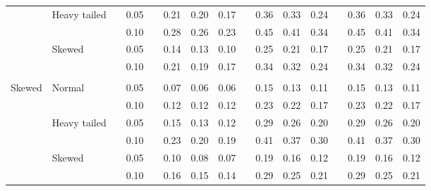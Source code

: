 \documentclass[12pt]{article} %
\begin{document}
\begin{table}[ht]
\begin{scriptsize}
\begin{center}
\begin{tabular}{ll p{.1cm} c p{.1cm} rrr p{.1cm} rrr p{.1cm} rrr}
             & Heavy tailed && 0.05 &&   0.21 & 0.20 & 0.17 && 0.36 & 0.33 & 0.24 && 0.36 & 0.33 & 0.24 \\ 
             &              && 0.10 &&   0.28 & 0.26 & 0.23 && 0.45 & 0.41 & 0.34 && 0.45 & 0.41 & 0.34 \\ 
             & Skewed       && 0.05 &&   0.14 & 0.13 & 0.10 && 0.25 & 0.21 & 0.17 && 0.25 & 0.21 & 0.17 \\ 
             &              && 0.10 &&   0.21 & 0.19 & 0.17 && 0.34 & 0.32 & 0.24 && 0.34 & 0.32 & 0.24 \\
             &&&&&&&&&&&&&&&\\ 
Skewed       & Normal       && 0.05 &&   0.07 & 0.06 & 0.06 && 0.15 & 0.13 & 0.11 && 0.15 & 0.13 & 0.11 \\ 
             &              && 0.10 &&   0.12 & 0.12 & 0.12 && 0.23 & 0.22 & 0.17 && 0.23 & 0.22 & 0.17 \\ 
             & Heavy tailed && 0.05 &&   0.15 & 0.13 & 0.12 && 0.29 & 0.26 & 0.20 && 0.29 & 0.26 & 0.20 \\ 
             &              && 0.10 &&   0.23 & 0.20 & 0.19 && 0.41 & 0.37 & 0.30 && 0.41 & 0.37 & 0.30 \\ 
             & Skewed       && 0.05 &&   0.10 & 0.08 & 0.07 && 0.19 & 0.16 & 0.12 && 0.19 & 0.16 & 0.12 \\ 
             &              && 0.10 &&   0.16 & 0.15 & 0.14 && 0.29 & 0.25 & 0.21 && 0.29 & 0.25 & 0.21 \\ 


\end{tabular}
\end{center}
\end{scriptsize}
\end{table}
\end{document}
